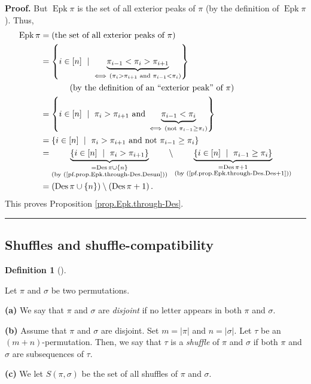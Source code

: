 \documentclass[numbers=enddot,12pt,final,onecolumn,notitlepage]{scrartcl}%
\theoremstyle{definition}
\newtheorem{defi}[theo]{Definition}
\newenvironment{definition}[1][]
{\begin{defi}[#1]\begin{leftbar}}
{\end{leftbar}\end{defi}}
\newenvironment{proof}[1][Proof]{\noindent\textbf{#1.} }{\ \rule{0.5em}{0.5em}}
\newenvironment{verlong}{}{}
\begin{document}
\begin{verlong}
\begin{proof}
But $\operatorname{Epk}\pi$ is the set of all exterior peaks of $\pi$ (by the
definition of $\operatorname{Epk}\pi$). Thus,%
\begin{align*}
\operatorname{Epk}\pi &  =\left(  \text{the set of all exterior peaks of }%
\pi\right) \\
&  =\left\{  i\in\left[  n\right]  \ \mid\ \underbrace{\pi_{i-1}<\pi_{i}%
>\pi_{i+1}}_{\Longleftrightarrow\ \left(  \pi_{i}>\pi_{i+1}\text{ and }%
\pi_{i-1}<\pi_{i}\right)  }\right\} \\
&  \ \ \ \ \ \ \ \ \ \ \left(  \text{by the definition of an \textquotedblleft
exterior peak\textquotedblright\ of }\pi\right) \\
&  =\left\{  i\in\left[  n\right]  \ \mid\ \pi_{i}>\pi_{i+1}\text{ and
}\underbrace{\pi_{i-1}<\pi_{i}}_{\Longleftrightarrow\ \left(  \text{not }%
\pi_{i-1}\geq\pi_{i}\right)  }\right\} \\
&  =\left\{  i\in\left[  n\right]  \ \mid\ \pi_{i}>\pi_{i+1}\text{ and not
}\pi_{i-1}\geq\pi_{i}\right\} \\
&  =\underbrace{\left\{  i\in\left[  n\right]  \ \mid\ \pi_{i}>\pi
_{i+1}\right\}  }_{\substack{=\operatorname{Des}\pi\cup\left\{  n\right\}
\\\text{(by (\ref{pf.prop.Epk.through-Des.Desun}))}}}\setminus
\underbrace{\left\{  i\in\left[  n\right]  \ \mid\ \pi_{i-1}\geq\pi
_{i}\right\}  }_{\substack{=\operatorname{Des}\pi+1\\\text{(by
(\ref{pf.prop.Epk.through-Des.Des+1}))}}}\\
&  =\left(  \operatorname{Des}\pi\cup\left\{  n\right\}  \right)
\setminus\left(  \operatorname{Des}\pi+1\right)  .
\end{align*}
This proves Proposition \ref{prop.Epk.through-Des}.
\end{proof}
\end{verlong}

\subsection{Shuffles and shuffle-compatibility}

\begin{definition}
\label{def.shuffles}Let $\pi$ and $\sigma$ be two permutations.

\textbf{(a)} We say that $\pi$ and $\sigma$ are \textit{disjoint} if no letter
appears in both $\pi$ and $\sigma$.

\textbf{(b)} Assume that $\pi$ and $\sigma$ are disjoint. Set $m=\left\vert
\pi\right\vert $ and $n=\left\vert \sigma\right\vert $. Let $\tau$ be an
$\left(  m+n\right)  $-permutation. Then, we say that $\tau$ is a
\textit{shuffle} of $\pi$ and $\sigma$ if both $\pi$ and $\sigma$ are
subsequences of $\tau$.

\textbf{(c)} We let $S\left(  \pi,\sigma\right)  $ be the set of all shuffles
of $\pi$ and $\sigma$.
\end{definition}
\end{document}
